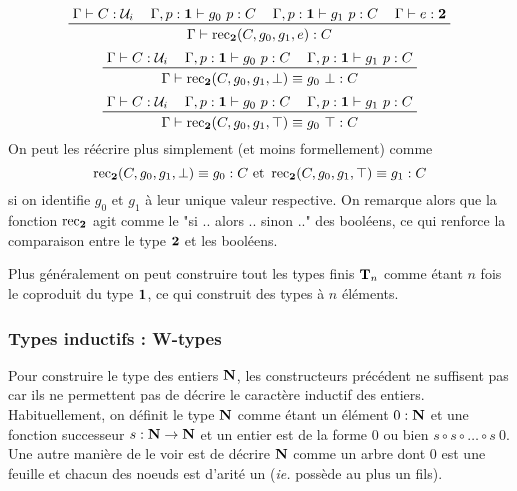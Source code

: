 \documentclass[../../rapport.tex]{subfiles}
\begin{document}
\begin{example}[Le type $\2$]
    $$
    \prfinterspace=1.2em
    \prftree
      {\Gamma \vdash C :\U_i}
      {\Gamma, p : \1 \vdash g_0\ p : C}
      {\Gamma, p : \1 \vdash g_1\ p : C}
      {\Gamma \vdash e : \2}
      {\Gamma \vdash \rec_{\2}(C, g_0, g_1, e) : C}
    $$
    $$
    \prfinterspace=1.2em
    \prftree{\Gamma \vdash C : \U_i}{\Gamma, p : \1 \vdash g_0\ p : C}{\Gamma, p : \1 \vdash g_1\ p : C}
      {\Gamma \vdash \rec_{\2}(C, g_0, g_1, \bot) \equiv g_0\ \bot : C}
    $$
    $$
    \prfinterspace=1.2em
    \prftree{\Gamma \vdash C : \U_i}{\Gamma, p : \1 \vdash g_0\ p : C}{\Gamma, p : \1 \vdash g_1\ p : C}
      {\Gamma \vdash \rec_{\2}(C, g_0, g_1, \top) \equiv g_0\ \top : C}
    $$
    On peut les réécrire plus simplement (et moins formellement) comme
    $$\operatorname{rec}_{\operatorname{\textbf{2}}}(C, g_0, g_1, \bot) \equiv g_0 : C \text{ et } \operatorname{rec}_{\operatorname{\textbf{2}}}(C, g_0, g_1, \top) \equiv g_1 : C$$
    si on identifie $g_0$ et $g_1$ à leur unique valeur respective.
    On remarque alors que la fonction $\operatorname{rec}_{\operatorname{\textbf{2}}}$ agit comme le "si .. alors .. sinon .." des booléens,
    ce qui renforce la comparaison entre le type $\2$ et les booléens.
  \end{example}

  Plus généralement on peut construire tout les types finis $\mathbf T_n$ comme étant $n$ fois le coproduit du type $\operatorname{\textbf{1}}$,
  ce qui construit des types à $n$ éléments.

  \subsubsection{Types inductifs : W-types}

  Pour construire le type des entiers $\mathbf N$, les constructeurs précédent ne suffisent pas car ils ne permettent
  pas de décrire le caractère inductif des entiers.
  Habituellement, on définit le type $\mathbf N$ comme étant un élément $0 : \mathbf N$ et une fonction successeur
  $s : \mathbf N \rightarrow \mathbf N$ et un entier est de la forme $0$ ou bien $s\circ s \circ \hdots \circ s\ 0$.
  Une autre manière de le voir est de décrire $\mathbf N$ comme un arbre dont $0$ est une feuille et
  chacun des noeuds est d'arité un (\textit{ie.} possède au plus un fils).

  \begin{figure}[ht]
    \centering
  \end{figure}
\end{document}
